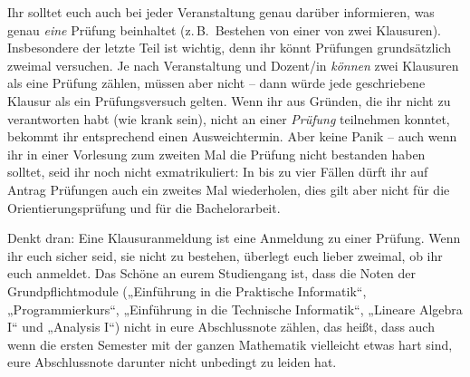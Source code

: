 Ihr solltet euch auch bei jeder Veranstaltung genau darüber informieren, was genau \emph{eine} Prüfung beinhaltet (z.\,B.\ Bestehen von einer von zwei Klausuren). Insbesondere der letzte Teil ist wichtig, denn ihr könnt Prüfungen grundsätzlich zweimal versuchen. Je nach Veranstaltung und Dozent/in \emph{können} zwei Klausuren als eine Prüfung zählen, müssen aber nicht -- dann würde jede geschriebene Klausur als ein Prüfungsversuch gelten. Wenn ihr aus Gründen, die ihr nicht zu verantworten habt (wie krank sein), nicht an einer \emph{Prüfung} teilnehmen konntet, bekommt ihr entsprechend einen Ausweichtermin. Aber keine Panik -- auch wenn ihr in einer Vorlesung zum zweiten Mal die Prüfung nicht bestanden haben solltet, seid ihr noch nicht exmatrikuliert: In bis zu vier Fällen dürft ihr auf Antrag Prüfungen auch ein zweites Mal wiederholen, dies gilt aber nicht für die Orientierungsprüfung und für die Bachelorarbeit.

Denkt dran: Eine Klausuranmeldung ist eine Anmeldung zu einer Prüfung. Wenn ihr euch sicher seid, sie nicht zu bestehen, überlegt euch lieber zweimal, ob ihr euch anmeldet. Das Schöne an eurem Studiengang ist, dass die Noten der Grundpflichtmodule („Einführung in die Praktische Informatik“, „Programmierkurs“, „Einführung in die Technische Informatik“, „Lineare Algebra I“ und „Analysis I“) nicht in eure Abschlussnote zählen, das heißt, dass auch wenn die ersten Semester mit der ganzen Mathematik vielleicht etwas hart sind, eure Abschlussnote darunter nicht unbedingt zu leiden hat.


\vspace{-\parskip}
